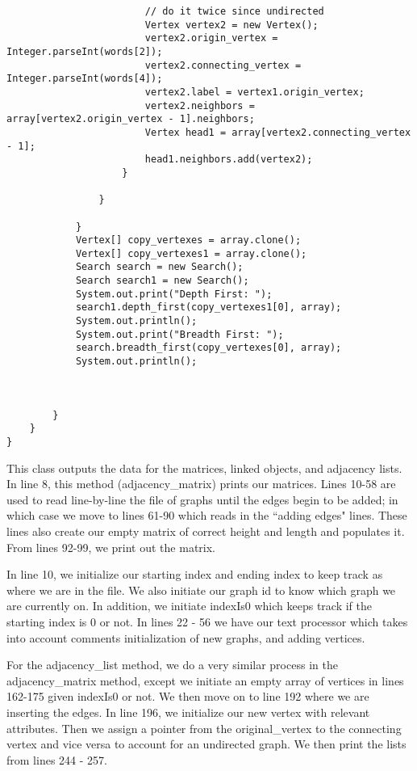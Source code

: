 \documentclass{article}
\begin{document}
\begin{lstlisting}
                        // do it twice since undirected
                        Vertex vertex2 = new Vertex();
                        vertex2.origin_vertex = Integer.parseInt(words[2]);
                        vertex2.connecting_vertex = Integer.parseInt(words[4]);
                        vertex2.label = vertex1.origin_vertex;
                        vertex2.neighbors = array[vertex2.origin_vertex - 1].neighbors;
                        Vertex head1 = array[vertex2.connecting_vertex - 1];
                        head1.neighbors.add(vertex2);
                    }

                }

            }
            Vertex[] copy_vertexes = array.clone();
            Vertex[] copy_vertexes1 = array.clone();
            Search search = new Search();
            Search search1 = new Search();
            System.out.print("Depth First: ");
            search1.depth_first(copy_vertexes1[0], array);
            System.out.println();
            System.out.print("Breadth First: ");
            search.breadth_first(copy_vertexes[0], array);
            System.out.println();



        }
    }
}

    \end{lstlisting}
    This class outputs the data for the matrices, linked objects, and adjacency lists.  In line 8, this method (adjacency\_matrix) prints our matrices. Lines 10-58 are used to read line-by-line the file of graphs until the edges begin to be added; in which case we move to lines 61-90 which reads in the ``adding edges" lines. These lines also create our empty matrix of correct height and length and populates it. From lines 92-99, we print out the matrix.
    
    In line 10, we initialize our starting index and ending index to keep track as where we are in the file.  We also initiate our graph id to know which graph we are currently on.  In addition, we initiate indexIs0 which keeps track if the starting index is 0 or not.  In lines 22 - 56 we have our text processor which takes into account comments initialization of new graphs, and adding vertices.
    
    For the adjacency\_list method, we do a very similar process in the adjacency\_matrix method, except we initiate an empty array of vertices in lines 162-175 given indexIs0 or not.  We then move on to line 192 where we are inserting the edges.  In line 196, we initialize our new vertex with relevant attributes.  Then we assign a pointer from the original\_vertex to the connecting vertex and vice versa to account for an undirected graph.  We then print the lists from lines 244 - 257.
    
\end{document}
